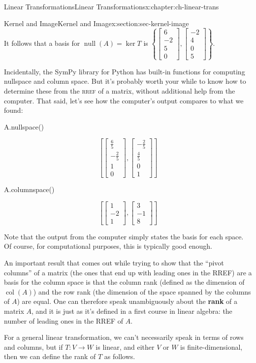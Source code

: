 \documentclass[oneside,10pt,]{book}
\newcommand{\initialism}[1]{\textsc{\MakeLowercase{#1}}}
\newcommand{\terminology}[1]{\textbf{#1}}
\numberwithin{equation}{section}
\newcommand{\bbm}{\begin{bmatrix}}
\newcommand{\ebm}{\end{bmatrix}}
\newcommand{\nll}{\operatorname{null}}
\newcommand{\csp}{\operatorname{col}}
\begin{document}
\begin{chapterptx}{Linear Transformations}{}{Linear Transformations}{}{}{x:chapter:ch-linear-trans}
\begin{sectionptx}{Kernel and Image}{}{Kernel and Image}{}{}{x:section:sec-kernel-image}
\begin{equation*}
\end{equation*}
It follows that a basis for \(\nll(A)=\ker T\) is \(\left\{\bbm 6\\-2\\5\\0\ebm, \bbm -2\\4\\0\\5\ebm\right\}\).%
\par
Incidentally, the SymPy library for Python has built-in functions for computing nullspace and column space. But it's probably worth your while to know how to determine these from the \initialism{RREF} of a matrix, without additional help from the computer. That said, let's see how the computer's output compares to what we found:%
\begin{sageinput}
A.nullspace()
\end{sageinput}
\begin{sageoutput}
\[\left[\bbm \frac65\\-\frac25\\1\\0\ebm, \bbm -\frac25\\ \frac45\\0\\1\ebm\right]\]
\end{sageoutput}
\begin{sageinput}
A.columnspace()
\end{sageinput}
\begin{sageoutput}
\[\left[\bbm 1\\-2\\1\ebm, \bbm 3\\-1\\8\ebm\right]\]
\end{sageoutput}
Note that the output from the computer simply states the basis for each space. Of course, for computational purposes, this is typically good enough.%
\par
An important result that comes out while trying to show that the ``pivot columns'' of a matrix (the ones that end up with leading ones in the RREF) are a basis for the column space is that the column rank (defined as the dimension of \(\csp(A)\)) and the row rank (the dimension of the space spanned by the columns of \(A\)) are equal. One can therefore speak unambiguously about the \terminology{rank} of a matrix \(A\), and it is just as it's defined in a first course in linear algebra: the number of leading ones in the RREF of \(A\).%
\par
For a general linear transformation, we can't necessarily speak in terms of rows and columns, but if \(T:V\to W\) is linear, and either \(V\) or \(W\) is finite-dimensional, then we can define the rank of \(T\) as follows.%

\end{sectionptx}
\end{chapterptx}
\end{document}
